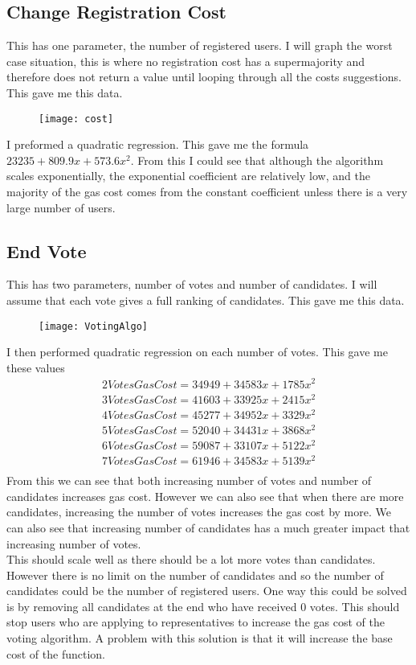 \subsection{Change Registration Cost}
This has one parameter, the number of registered users. I will graph the worst case situation, this is where no registration cost has a supermajority and therefore does not return a value until looping through all the costs suggestions. This gave me this data. \\
\begin{figure}[H]
\texttt{[image: cost]}
\end{figure}
I preformed a quadratic regression. This gave me the formula $23235 + 809.9x + 573.6x^2$. From this I could see that although the algorithm scales exponentially, the exponential coefficient are relatively low, and the majority of the gas cost comes from the constant coefficient unless there is a very large number of users. 
\subsection{End Vote}
This has two parameters, number of votes and number of candidates. I will assume that each vote gives a full ranking of candidates. This gave me this data. 
\begin{figure}[H]
\texttt{[image: VotingAlgo]}
\end{figure}
I then performed quadratic regression on each number of votes. This gave me these values 
\begin{gather*}
2 Votes Gas Cost = 34949 + 34583x + 1785x^2 \\
3 Votes Gas Cost = 41603 + 33925x + 2415x^2 \\
4 Votes Gas Cost = 45277 + 34952x + 3329x^2 \\
5 Votes Gas Cost = 52040 + 34431x + 3868x^2 \\
6 Votes Gas Cost = 59087 + 33107x + 5122x^2 \\
7 Votes Gas Cost = 61946 + 34583x + 5139x^2 \\
\end{gather*}
From this we can see that both increasing number of votes and number of candidates increases gas cost. However we can also see that when there are more candidates, increasing the number of votes increases the gas cost by more. We can also see that increasing number of candidates has a much greater impact that increasing number of votes.\\
This should scale well as there should be a lot more votes than candidates. However there is no limit on the number of candidates and so the number of candidates could be the number of registered users. One way this could be solved is by removing all candidates at the end who have received 0 votes. This should stop users who are applying to representatives to increase the gas cost of the voting algorithm. A problem with this solution is that it will increase the base cost of the function.
